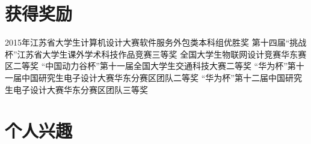 \documentclass[11pt, a4paper]{moderncv}
\begin{document}
	\section{获得奖励}
	{2015年江苏省大学生计算机设计大赛软件服务外包类本科组优胜奖}{}{}{}{}
	{第十四届“挑战杯”江苏省大学生课外学术科技作品竞赛三等奖}{}{}{}{}
	{全国大学生物联网设计竞赛华东赛区二等奖}{}{}{}{}
	{“中国动力谷杯”第十一届全国大学生交通科技大赛二等奖}{}{}{}{}
	{“华为杯”第十一届中国研究生电子设计大赛华东分赛区团队二等奖}{}{}{}{}
	{“华为杯”第十二届中国研究生电子设计大赛华东分赛区团队三等奖 }{}{}{}{}

	\section{个人兴趣}
\end{document}
